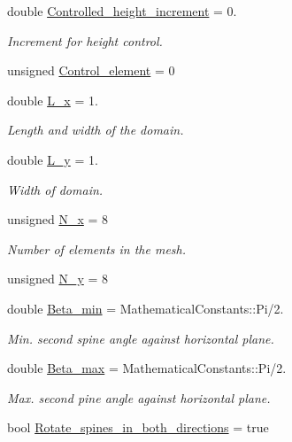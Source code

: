 \begin{DoxyCompactItemize}
double \hyperlink{namespaceGlobalParameters_a65fe7fd6c6c54d7ba89fab47cd4a9141}{Controlled\+\_\+height\+\_\+increment} = 0.
\begin{DoxyCompactList}\small\item\em Increment for height control. \end{DoxyCompactList}\item 
unsigned \hyperlink{namespaceGlobalParameters_a3a90a762edbce6d2a95456df26e85cea}{Control\+\_\+element} = 0
\item 
double \hyperlink{namespaceGlobalParameters_a36ebf514fdd1e78fff69907b39e25af6}{L\+\_\+x} = 1.
\begin{DoxyCompactList}\small\item\em Length and width of the domain. \end{DoxyCompactList}\item 
double \hyperlink{namespaceGlobalParameters_ac8774b3418c4551091d64ec72c169b2e}{L\+\_\+y} = 1.
\begin{DoxyCompactList}\small\item\em Width of domain. \end{DoxyCompactList}\item 
unsigned \hyperlink{namespaceGlobalParameters_ab020cb50fa321b26e8d2127d2cff23b9}{N\+\_\+x} = 8
\begin{DoxyCompactList}\small\item\em Number of elements in the mesh. \end{DoxyCompactList}\item 
unsigned \hyperlink{namespaceGlobalParameters_a711d6f05552ddaac30bd245ae8bdf878}{N\+\_\+y} = 8
\item 
double \hyperlink{namespaceGlobalParameters_aeb7f1ae574be563e0b603662c6fff5aa}{Beta\+\_\+min} = Mathematical\+Constants\+::\+Pi/2.
\begin{DoxyCompactList}\small\item\em Min. second spine angle against horizontal plane. \end{DoxyCompactList}\item 
double \hyperlink{namespaceGlobalParameters_aa34aff6eb29a2a1245e9ffc2fac42caa}{Beta\+\_\+max} = Mathematical\+Constants\+::\+Pi/2.
\begin{DoxyCompactList}\small\item\em Max. second pine angle against horizontal plane. \end{DoxyCompactList}\item 
bool \hyperlink{namespaceGlobalParameters_a69a238365a4fef33b1abdae287185f3e}{Rotate\+\_\+spines\+\_\+in\+\_\+both\+\_\+directions} = true

\end{DoxyCompactItemize}
